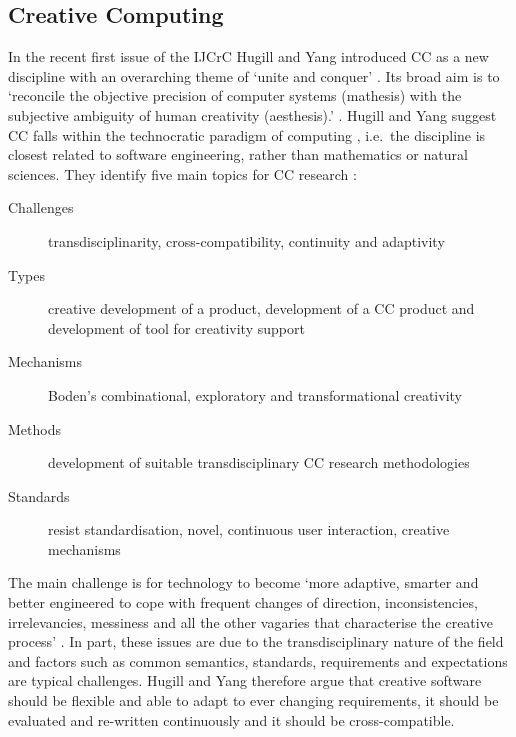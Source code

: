 \subsection*{Creative Computing}


In the recent first issue of the \ac{IJCrC} Hugill and Yang introduced \ac{CC} as a new discipline \autocite{Hugill2013c} with an overarching theme of `unite and conquer' \autocite[p.1, his emphasis]{Yang2013}. Its broad aim is to `reconcile the objective precision of computer systems (mathesis) with the subjective ambiguity of human creativity (aesthesis).' \autocite[p.5]{Hugill2013c}. Hugill and Yang suggest \ac{CC} falls within the technocratic paradigm of computing \autocite[see also][p.8]{Eden2007}, i.e.\ the discipline is closest related to software engineering, rather than mathematics or natural sciences. They identify five main topics for \ac{CC} research \autocite[p.15-17]{Hugill2013c}:

\begin{description}
  \item [Challenges] transdisciplinarity, cross-compatibility, continuity and adaptivity
  \item [Types] creative development of a product, development of a \ac{CC} product and development of tool for creativity support
  \item [Mechanisms]	Boden’s combinational, exploratory and transformational creativity
  \item [Methods] development of suitable transdisciplinary \ac{CC} research methodologies
  \item [Standards] resist standardisation, novel, continuous user interaction, creative mechanisms
\end{description}

The main challenge is for technology  to become `more adaptive, smarter and better engineered to cope with frequent changes of direction, inconsistencies, irrelevancies, messiness and all the other vagaries that characterise the creative process' \autocite[p.5]{Hugill2013c}. In part, these issues are due to the transdisciplinary nature of the field and factors such as common semantics, standards, requirements and expectations are typical challenges. Hugill and Yang therefore argue that creative software should be flexible and able to adapt to ever changing requirements, it should be evaluated and re-written continuously and it should be cross-compatible.


